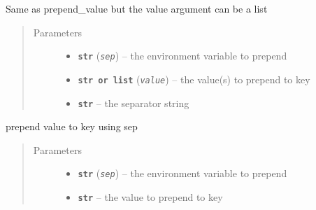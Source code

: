 \documentclass[a4paper,10pt,english]{sphinxmanual}
\begin{document}
\begin{fulllineitems}
\begin{fulllineitems}
\begin{quote}
\begin{description}
\end{description}\end{quote}

\end{fulllineitems}


\begin{fulllineitems}
\label{commands/apidoc/src:src.fileEnviron.FileEnviron.prepend}
Same as prepend\_value but the value argument can be a list
\begin{quote}\begin{description}
\item[{Parameters}] \leavevmode\begin{itemize}
\item {} 
\textbf{\texttt{str}} (\emph{\texttt{sep}}) -- the environment variable to prepend

\item {} 
\textbf{\texttt{str or list}} (\emph{\texttt{value}}) -- the value(s) to prepend to key

\item {} 
\textbf{\texttt{str}} -- the separator string

\end{itemize}

\end{description}\end{quote}

\end{fulllineitems}


\begin{fulllineitems}
\label{commands/apidoc/src:src.fileEnviron.FileEnviron.prepend_value}
prepend value to key using sep
\begin{quote}\begin{description}
\item[{Parameters}] \leavevmode\begin{itemize}
\item {} 
\textbf{\texttt{str}} (\emph{\texttt{sep}}) -- the environment variable to prepend

\item {} 
\textbf{\texttt{str}} -- the value to prepend to key


\end{itemize}
\end{description}
\end{quote}
\end{fulllineitems}
\end{fulllineitems}
\end{document}
